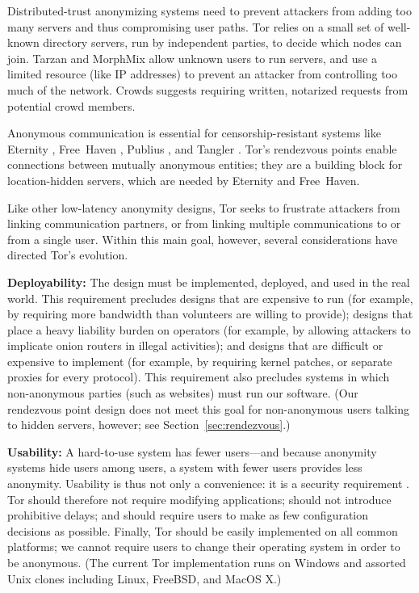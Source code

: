 \documentclass[times,10pt,twocolumn]{article}
\begin{document}
Distributed-trust anonymizing systems need to prevent attackers from
adding too many servers and thus compromising user paths.
Tor relies on a small set of well-known directory servers, run by
independent parties, to decide which nodes can
join. Tarzan and MorphMix allow unknown users to run servers, and use
a limited resource (like IP addresses) to prevent an attacker from
controlling too much of the network.  Crowds suggests requiring
written, notarized requests from potential crowd members.

Anonymous communication is essential for censorship-resistant
systems like Eternity \cite{eternity}, Free~Haven \cite{freehaven-berk},
Publius \cite{publius}, and Tangler \cite{tangler}. Tor's rendezvous
points enable connections between mutually anonymous entities; they
are a building block for location-hidden servers, which are needed by
Eternity and Free~Haven.


\label{sec:assumptions}

Like other low-latency anonymity designs, Tor seeks to frustrate
attackers from linking communication partners, or from linking
multiple communications to or from a single user.  Within this
main goal, however, several considerations have directed
Tor's evolution.

\textbf{Deployability:} The design must be implemented,
deployed, and used in the real world.  This requirement precludes designs
that are expensive to run (for example, by requiring more bandwidth
than volunteers are willing to provide); designs that place a heavy
liability burden on operators (for example, by allowing attackers to
implicate onion routers in illegal activities); and designs that are
difficult or expensive to implement (for example, by requiring kernel
patches, or separate proxies for every protocol).  This requirement also
precludes systems in which non-anonymous parties (such as websites)
must run our software.  (Our rendezvous point design does not meet
this goal for non-anonymous users talking to hidden servers,
however; see Section~\ref{sec:rendezvous}.)

\textbf{Usability:} A hard-to-use system has fewer users---and because
anonymity systems hide users among users, a system with fewer users
provides less anonymity.  Usability is thus not only a convenience:
it is a security requirement \cite{econymics,back01}. Tor should
therefore not
require modifying applications; should not introduce prohibitive delays;
and should require users to make as few configuration decisions
as possible.  Finally, Tor should be easily implemented on all common
platforms; we cannot require users to change their operating system in order
to be anonymous.  (The current Tor implementation runs on Windows and
assorted Unix clones including Linux, FreeBSD, and MacOS X.)
\end{document}
